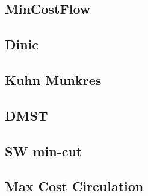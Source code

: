 \documentclass[a4paper,10pt,twocolumn,oneside]{article}
\begin{document}
\subsection{MinCostFlow}


\subsection{Dinic}


%

%

%

\subsection{Kuhn Munkres}


\subsection{DMST}


\subsection{SW min-cut}


\subsection{Max Cost Circulation}


%
\end{document}

